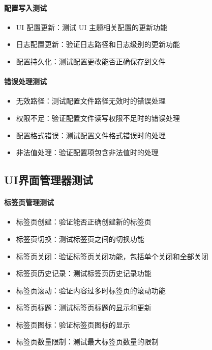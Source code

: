 \documentclass[a4paper,12pt]{report}	%
\begin{document}
\paragraph{配置写入测试}
\begin{itemize}
    \item UI 配置更新：测试 UI 主题相关配置的更新功能
    \item 日志配置更新：验证日志路径和日志级别的更新功能
    \item 配置持久化：测试配置更改能否正确保存到文件
\end{itemize}

\paragraph{错误处理测试}
\begin{itemize}
    \item 无效路径：测试配置文件路径无效时的错误处理
    \item 权限不足：验证配置文件读写权限不足时的错误处理
    \item 配置格式错误：测试配置文件格式错误时的处理
    \item 非法值处理：验证配置项包含非法值时的处理
\end{itemize}

\subsection{UI界面管理器测试}

\paragraph{标签页管理测试}
\begin{itemize}
    \item 标签页创建：验证能否正确创建新的标签页
    \item 标签页切换：测试标签页之间的切换功能
    \item 标签页关闭：验证标签页关闭功能，包括单个关闭和全部关闭
    \item 标签页历史记录：测试标签页历史记录功能
    \item 标签页滚动：验证内容过多时标签页的滚动功能
    \item 标签页标题：测试标签页标题的显示和更新
    \item 标签页图标：验证标签页图标的显示
    \item 标签页数量限制：测试最大标签页数量的限制
\end{itemize}
\end{document}
